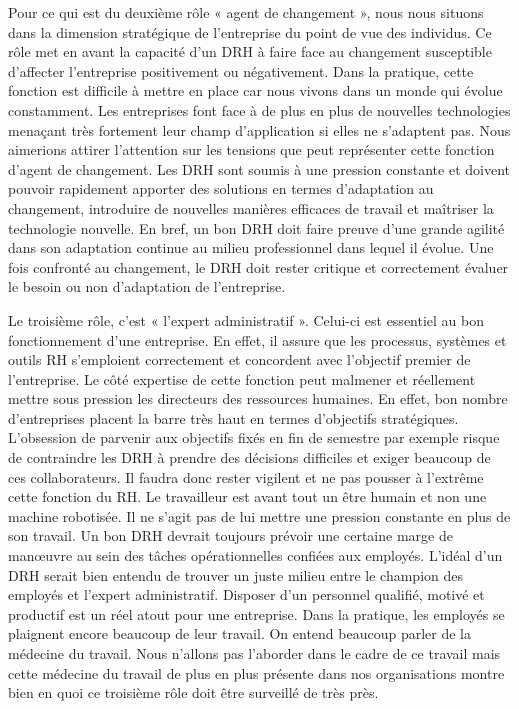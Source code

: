 \documentclass[a4paper, 12pt]{article}
\begin{document}
Pour ce qui est du deuxième rôle « agent de changement », nous nous situons dans la dimension stratégique de l'entreprise du point de vue des individus. Ce rôle met en avant la capacité d'un DRH à faire face au changement susceptible d'affecter l'entreprise positivement ou négativement. Dans la pratique, cette fonction est difficile à mettre en place car nous vivons dans un monde qui évolue constamment. Les entreprises font face à de plus en plus de nouvelles technologies menaçant très fortement leur champ d'application si elles ne s'adaptent pas. 
Nous aimerions attirer l'attention sur les tensions que peut représenter cette fonction d'agent de changement. Les DRH sont soumis à une pression constante et doivent pouvoir rapidement apporter des solutions en termes d'adaptation au changement, introduire de nouvelles manières efficaces de travail et maîtriser la technologie nouvelle. En bref, un bon DRH doit faire preuve d'une grande agilité dans son adaptation continue au milieu professionnel dans lequel il évolue. Une fois confronté au changement, le DRH doit rester critique et correctement évaluer le besoin ou non d'adaptation de l'entreprise.

Le troisième rôle, c'est « l'expert administratif ». Celui-ci est essentiel au bon fonctionnement d'une entreprise. En effet, il assure que les processus, systèmes et outils RH s'emploient correctement et concordent avec  l'objectif premier de l'entreprise. Le côté expertise de cette fonction peut malmener et réellement mettre sous pression les directeurs des ressources humaines. En effet, bon nombre d'entreprises placent la barre très haut en termes d'objectifs stratégiques. L'obsession de parvenir aux objectifs fixés en fin de semestre par exemple risque de contraindre les DRH à prendre des décisions difficiles et exiger beaucoup de ces collaborateurs. Il faudra  donc rester vigilent et ne pas pousser à l'extrême cette fonction du RH. Le travailleur est avant tout un être humain et non une machine robotisée. Il ne s'agit pas de lui mettre une pression constante en plus de son travail. Un bon DRH devrait toujours prévoir une certaine marge de manœuvre au sein des tâches opérationnelles confiées aux employés. L'idéal d'un DRH serait bien entendu de trouver un juste milieu entre le champion des employés et l'expert administratif. Disposer d'un personnel qualifié, motivé et productif est un réel atout pour une entreprise. Dans la pratique, les employés se plaignent encore beaucoup de leur travail. On entend beaucoup parler de la médecine du travail. Nous n'allons pas l'aborder dans le cadre de ce travail mais cette médecine du travail de plus en plus présente dans nos organisations montre bien en quoi ce troisième rôle doit être surveillé de très près.
\end{document}
